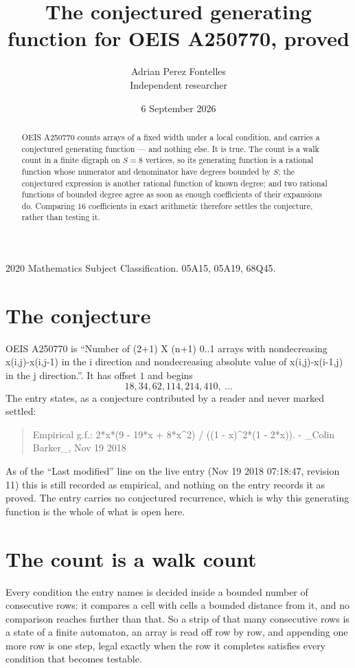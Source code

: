 \documentclass[11pt,a4paper]{article}
\title{The conjectured generating function for OEIS A250770, proved}
\author{Adrian Perez Fontelles\\ \small Independent researcher}
\date{6 September 2026}
\theoremstyle{plain}
\theoremstyle{definition}
\begin{document}
\maketitle

\begin{abstract}
OEIS A250770 counts arrays of a fixed width under a local condition, and carries a conjectured
generating function --- and nothing else. It is true. The count is a walk count in a finite
digraph on $S=8$ vertices, so its generating function is a rational function whose numerator
and denominator have degrees bounded by $S$; the conjectured expression is another rational
function of known degree; and two rational functions of bounded degree agree as soon as enough
coefficients of their expansions do. Comparing $16$ coefficients in exact arithmetic
therefore settles the conjecture, rather than testing it.
\end{abstract}

\noindent\small 2020 Mathematics Subject Classification. 05A15, 05A19, 68Q45.\normalsize

\section{The conjecture}

OEIS A250770 is ``Number of (2+1) X (n+1) 0..1 arrays with nondecreasing x(i,j)-x(i,j-1) in the i direction and nondecreasing absolute value of x(i,j)-x(i-1,j) in the j direction.''. It has offset $1$ and begins
\[
18, 34, 62, 114, 214, 410,\ \dots
\]
The entry states, as a conjecture contributed by a reader and never marked settled:
\begin{quote}
Empirical g.f.: 2*x*(9 - 19*x + 8*x\^{}2) / ((1 - x)\^{}2*(1 - 2*x)). - \_Colin Barker\_, Nov 19 2018
\end{quote}
As of the ``Last modified'' line on the live entry (Nov 19 2018 07:18:47, revision 11) this is still
recorded as empirical, and nothing on the entry records it as proved. The entry carries no
conjectured recurrence, which is why this generating function is the whole of what is open
here.

\section{The count is a walk count}

Every condition the entry names is decided inside a bounded number of consecutive rows: it
compares a cell with cells a bounded distance from it, and no comparison reaches further than
that. So a strip of that many consecutive rows is a state of a finite automaton, an array is
read off row by row, and appending one more row is one step, legal exactly when the row it
completes satisfies every condition that becomes testable.
\end{document}
